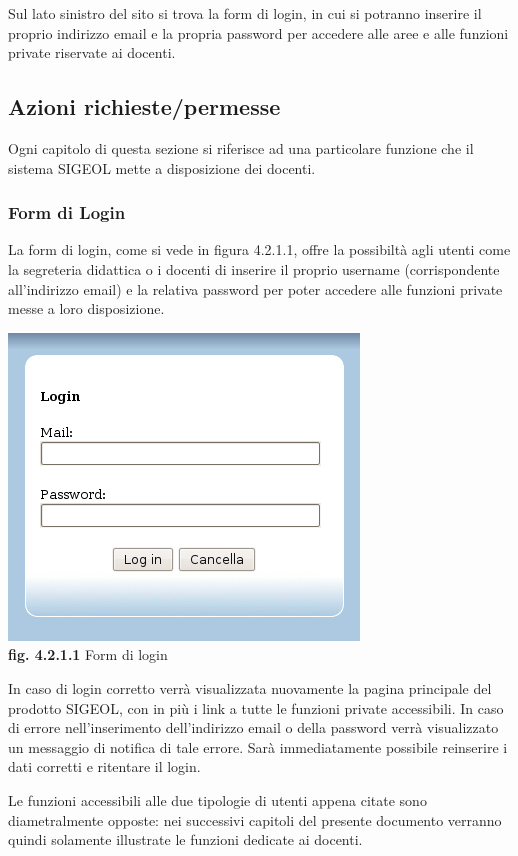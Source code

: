 \documentclass[11pt,a4paper]{article}
\begin{document}
Sul lato sinistro del sito si trova la form di login, in cui si potranno inserire il proprio indirizzo email e la propria password per accedere alle aree e alle funzioni private riservate ai docenti.
\subsection{Azioni richieste/permesse}
Ogni capitolo di questa sezione si riferisce ad una particolare funzione che il sistema SIGEOL mette a disposizione dei docenti.
\subsubsection{Form di Login}
La form di login, come si vede in figura 4.2.1.1, offre la possibiltà agli utenti come la segreteria didattica o i docenti di inserire il proprio username (corrispondente all'indirizzo email) e la relativa password per poter accedere alle funzioni private messe a loro disposizione.

\begin{center}
	\includegraphics[scale=0.5]{images/login.jpg}\\
	\textbf{fig. 4.2.1.1} Form di login\\
\end{center}
\bigskip

In caso di login corretto verrà visualizzata nuovamente la pagina principale del prodotto SIGEOL, con in più i link a tutte le funzioni private accessibili.
In caso di errore nell'inserimento dell'indirizzo email o della password verrà visualizzato un messaggio di notifica di tale errore.
Sarà immediatamente possibile reinserire i dati corretti e ritentare il login.

Le funzioni accessibili alle due tipologie di utenti appena citate sono diametralmente opposte: nei successivi capitoli del presente documento verranno quindi solamente illustrate le funzioni dedicate ai docenti.
\end{document}
